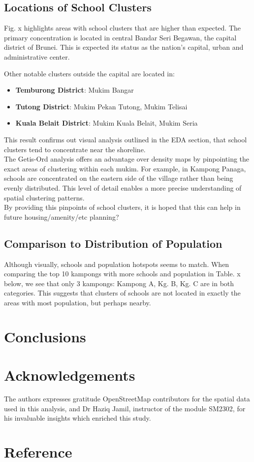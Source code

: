 \documentclass[12pt]{article}
\begin{document}
\subsection{Locations of School Clusters}
Fig. x highlights areas with school clusters that are higher than expected. The primary concentration is located in central Bandar Seri Begawan, the capital district of Brunei. This is expected its status as the nation’s capital, urban and administrative center.

Other notable clusters outside the capital are located in:
\begin{itemize}
    \item \textbf{Temburong District}: Mukim Bangar
    \item \textbf{Tutong District}: Mukim Pekan Tutong, Mukim Telisai
    \item \textbf{Kuala Belait District}: Mukim Kuala Belait, Mukim Seria
\end{itemize}

This result confirms out visual analysis outlined in the EDA section,  that school clusters tend to concentrate near the shoreline. \\

The Getis-Ord analysis offers an advantage over density maps by pinpointing the exact areas of clustering within each mukim. For example, in Kampong Panaga, schools are concentrated on the eastern side of the village rather than being evenly distributed. This level of detail enables a more precise understanding of spatial clustering patterns. \\

By providing this pinpoints of school clusters, it is hoped that this can help in future housing/amenity/etc planning? \\


\subsection{Comparison to Distribution of Population}

Although visually, schools and population hotspots seems to match. When comparing the top 10 kampongs with more schools and population in Table. x below, we see that only 3 kampongs: Kampong A, Kg. B, Kg. C are in both categories. This suggests that clusters of schools are not located in exactly the areas with most population, but perhaps nearby. 


\section{Conclusions}

\section{Acknowledgements}
 The authors expresses gratitude OpenStreetMap contributors for the spatial data used in this analysis, and Dr Haziq Jamil, instructor of the module SM2302, for his invaluable insights
 which enriched this study.
 
\section{Reference}
\end{document}
